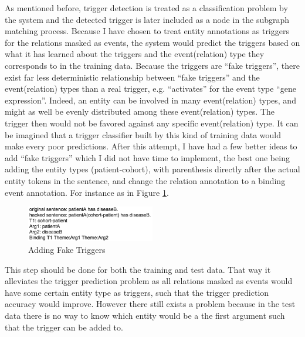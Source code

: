 As mentioned before, trigger detection is treated as a classification problem by the system and the detected trigger is later included as a node in the subgraph matching process. Because I have chosen to treat entity annotations as triggers for the relations masked as events, the system would predict the triggers based on what it has learned about the triggers and the event(relation) type they corresponds to in the training data. Because the triggers are  ``fake triggers'', there exist far less deterministic relationship between ``fake triggers'' and the event(relation) types than a real trigger, e.g. ``activates'' for the event type ``gene expression''. Indeed, an entity can be involved in many event(relation) types, and might as well be evenly distributed among these event(relation) types. The trigger then would not be favored against any specific event(relation) type. It can be imagined that a trigger classifier built by this kind of training data would make every poor predictions.  
\newline\newline
 After this attempt, I have had a few better ideas to add ``fake triggers'' which I did not have time to implement, the best one being adding the entity types (patient-cohort), with parenthesis directly after the actual entity tokens in the sentence, and change the relation annotation to a binding event annotation. For instance as in Figure \ref{fig:fake_trigger}.
 \begin{figure}[h]
 	\centering
 	\includegraphics[width=0.5\textwidth]{fake_trigger}
 	\caption{Adding Fake Triggers}
 	\label{fig:fake_trigger}   
 \end{figure}
 This step should be done for both the training and test data. That way it alleviates the trigger prediction problem as all relations masked as events would have some certain entity type as triggers, such that the trigger prediction accuracy would improve. However there still exists a problem because in the test data there is no way to know which entity would be a the first argument such that the trigger can be added to.
